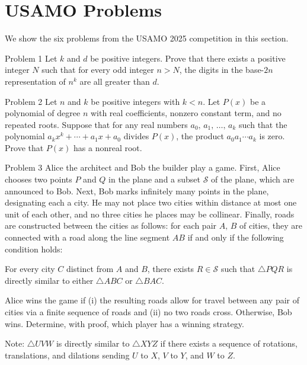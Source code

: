 \section{USAMO Problems}\label{app:problems}

We show the six problems from the USAMO 2025 competition in this section.

\begin{problem}{Problem 1}
    Let $k$ and $d$ be positive integers. Prove that there exists a positive integer $N$ such that for every odd integer $n>N$, the digits in the base-$2n$ representation of $n^k$ are all greater than $d$.
\end{problem}

\begin{problem}{Problem 2}
    Let $n$ and $k$ be positive integers with $k<n$. Let $P(x)$ be a polynomial of degree $n$ with real coefficients, nonzero constant term, and no repeated roots. Suppose that for any real numbers $a_0,\,a_1,\,\ldots,\,a_k$ such that the polynomial $a_kx^k+\cdots+a_1x+a_0$ divides $P(x)$, the product $a_0a_1\cdots a_k$ is zero. Prove that $P(x)$ has a nonreal root.
\end{problem}

\begin{problem}{Problem 3}
    Alice the architect and Bob the builder play a game. First, Alice chooses two points $P$ and $Q$ in the plane and a subset $\mathcal{S}$ of the plane, which are announced to Bob. Next, Bob marks infinitely many points in the plane, designating each a city. He may not place two cities within distance at most one unit of each other, and no three cities he places may be collinear. Finally, roads are constructed between the cities as follows: for each pair $A,\,B$ of cities, they are connected with a road along the line segment $AB$ if and only if the following condition holds:
    \begin{center}
    For every city $C$ distinct from $A$ and $B$, there exists $R\in\mathcal{S}$ such
    that $\triangle PQR$ is directly similar to either $\triangle ABC$ or $\triangle BAC$.
    \end{center}
    Alice wins the game if (i) the resulting roads allow for travel between any pair of cities via a finite sequence of roads and (ii) no two roads cross. Otherwise, Bob wins. Determine, with proof, which player has a winning strategy.
    
    Note: $\triangle UVW$ is directly similar to $\triangle XYZ$ if there exists a sequence of rotations, translations, and dilations sending $U$ to $X$, $V$ to $Y$, and $W$ to $Z$.
\end{problem}

